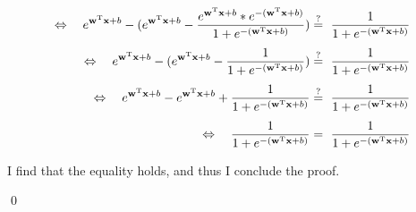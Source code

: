 \begin{align*}
  \Leftrightarrow\quad \ea - (\ea - \frac{\ea * \eam}{1 + \eam})&\myeq \ \frac{1}{1 + \eam}\\[4pt]
  \Leftrightarrow\quad \ea - (\ea - \frac{1}{1 + \eam})&\myeq \ \frac{1}{1 + \eam}\\[4pt]
  \Leftrightarrow\quad \ea - \ea + \frac{1}{1 + \eam}&\myeq \ \frac{1}{1 + \eam}\\[4pt]
  \Leftrightarrow\quad \frac{1}{1 + \eam} &= \ \frac{1}{1 + \eam}
\end{align*}

I find that the equality holds, and thus I conclude the proof.

\qed

\sectend

